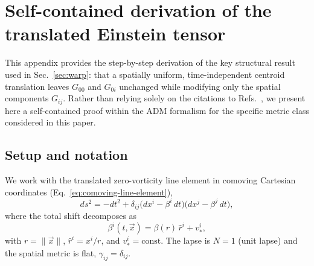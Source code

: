 \documentclass[11pt]{article}
\begin{document}
\appendix

\section{Self-contained derivation of the translated Einstein tensor}
\label{app:translated-Gab}

This appendix provides the step-by-step derivation of the key structural result used in Sec.~\ref{sec:warp}: that a spatially uniform, time-independent centroid translation leaves $G_{00}$ and $G_{0i}$ unchanged while modifying only the spatial components $G_{ij}$. Rather than relying solely on the citations to Refs.~\cite{Santiago:2021aup,Schuster:2023ADMmass}, we present here a self-contained proof within the ADM formalism for the specific metric class considered in this paper.

\subsection{Setup and notation}
We work with the translated zero-vorticity line element in comoving Cartesian coordinates (Eq.~\eqref{eq:comoving-line-element}),
\begin{equation}
\label{eq:app-metric}
ds^2 = -dt^2 + \delta_{ij}\bigl(dx^i - \beta^i\,dt\bigr)\bigl(dx^j - \beta^j\,dt\bigr),
\end{equation}
where the total shift decomposes as
\begin{equation}
\label{eq:app-shift}
\beta^i(t,\vec x) = \beta(r)\,\hat r^i + v_*^i,
\end{equation}
with $r = \|\vec x\|$, $\hat r^i = x^i/r$, and $v_*^i = \text{const}$. The lapse is $N = 1$ (unit lapse) and the spatial metric is flat, $\gamma_{ij} = \delta_{ij}$.
\end{document}
